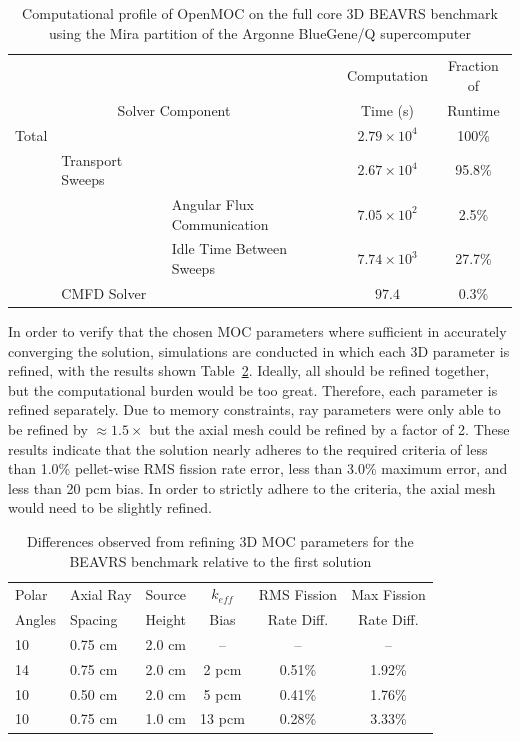 \documentclass[12pt,twoside]{mitthesis-exec}
\begin{document}
\begin{table}[ht]
	\centering
	\caption{Computational profile of OpenMOC on the full core 3D BEAVRS benchmark using the Mira partition of the Argonne BlueGene/Q supercomputer}
	\medskip
	\begin{tabular}{lll|c|c}
		\hline
		& & & Computation & Fraction of \\
		\multicolumn{3}{c|}{Solver Component} & Time (s) & Runtime\\
		\hline
		Total & & & $2.79 \times 10^4$ & 100\% \\
		& Transport Sweeps & & $2.67 \times 10^4$ & 95.8\% \\
		& & Angular Flux Communication & $7.05 \times 10^2$ & 2.5\% \\
		& & Idle Time Between Sweeps & $7.74 \times 10^3$ & 27.7\% \\
		& CMFD Solver & & $97.4$ & 0.3\% \\		
		\hline
	\end{tabular}
	\label{tab:full-core-comp-prof}
\end{table}

\newpage

            
In order to verify that the chosen MOC parameters where sufficient in accurately converging the solution, simulations are conducted in which each 3D parameter is refined, with the results shown Table~\ref{tab:fc-param-sensitivity}. Ideally, all should be refined together, but the computational burden would be too great. Therefore, each parameter is refined separately. Due to memory constraints, ray parameters were only able to be refined by $\approx 1.5 \times$ but the axial mesh could be refined by a factor of 2. These results indicate that the solution nearly adheres to the required criteria of less than 1.0\% pellet-wise RMS fission rate error, less than 3.0\% maximum error, and less than 20 pcm bias. In order to strictly adhere to the criteria, the axial mesh would need to be slightly refined.

\begin{table}[ht]
	\centering
	\caption{Differences observed from refining 3D MOC parameters for the BEAVRS benchmark relative to the first solution}
	\medskip
	\begin{tabular}{l|l|l|c|c|c}
		\hline
		Polar  & Axial Ray & Source & $k_{\textit{eff}}$  & RMS Fission & Max Fission \\
		Angles & Spacing   & Height & Bias                & Rate Diff. & Rate Diff. \\
		\hline
		10 & 0.75 cm & 2.0 cm & --     & --     & --  \\
		14 & 0.75 cm & 2.0 cm & 2 pcm  & 0.51\% & 1.92\%  \\
		10 & 0.50 cm & 2.0 cm & 5 pcm  & 0.41\% & 1.76\%  \\
		10 & 0.75 cm & 1.0 cm & 13 pcm & 0.28\% & 3.33\%  \\
		\hline
	\end{tabular}
	\label{tab:fc-param-sensitivity}
\end{table}
\end{document}
